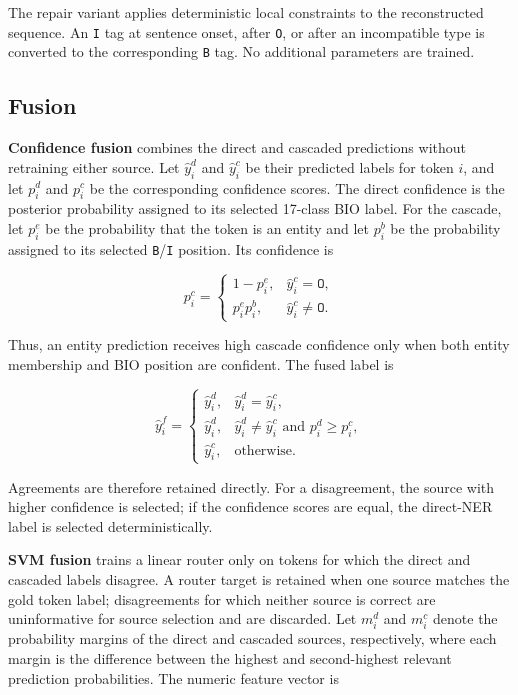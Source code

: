 \documentclass[conference,a4paper]{IEEEtran}
\begin{document}
The repair variant applies deterministic local constraints to the reconstructed sequence. An \texttt{I} tag at sentence onset, after \texttt{O}, or after an incompatible type is converted to the corresponding \texttt{B} tag. No additional parameters are trained.

\subsection{Fusion}

\textbf{Confidence fusion} combines the direct and cascaded predictions without retraining either source. Let $\hat y_i^d$ and $\hat y_i^c$ be their predicted labels for token $i$, and let $p_i^d$ and $p_i^c$ be the corresponding confidence scores. The direct confidence is the posterior probability assigned to its selected 17-class BIO label. For the cascade, let $p_i^e$ be the probability that the token is an entity and let $p_i^b$ be the probability assigned to its selected \texttt{B}/\texttt{I} position. Its confidence is

\begin{equation}
p_i^c=
\begin{cases}
1-p_i^e, & \hat y_i^c=\texttt{O},\\
p_i^e p_i^b, & \hat y_i^c\ne\texttt{O}.
\end{cases}
\end{equation}

Thus, an entity prediction receives high cascade confidence only when both entity membership and BIO position are confident. The fused label is

\begin{equation}
\hat y_i^{f}=\begin{cases}
\hat y_i^d, & \hat y_i^d=\hat y_i^c,\\
\hat y_i^d, & \hat y_i^d\ne\hat y_i^c \text{ and } p_i^d\ge p_i^c,\\
\hat y_i^c, & \text{otherwise.}
\end{cases}
\end{equation}

Agreements are therefore retained directly. For a disagreement, the source with higher confidence is selected; if the confidence scores are equal, the direct-NER label is selected deterministically.

\textbf{SVM fusion} trains a linear router only on tokens for which the direct and cascaded labels disagree. A router target is retained when one source matches the gold token label; disagreements for which neither source is correct are uninformative for source selection and are discarded. Let $m_i^d$ and $m_i^c$ denote the probability margins of the direct and cascaded sources, respectively, where each margin is the difference between the highest and second-highest relevant prediction probabilities. The numeric feature vector is
\end{document}
